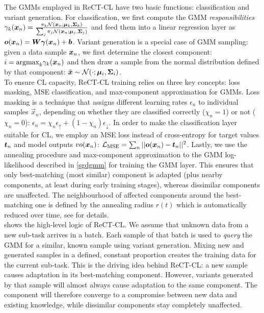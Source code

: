 \documentclass{article} %
\newcommand{\vgamma}{{\bm \gamma}}
\begin{document}
The GMMs emplayed in ReCT-CL have two basic functions: classification and variant generation.
For classification, 
we first compute the GMM \textit{responsibilities} $\gamma_k({\bm{x}}_n) = \frac{\pi_k\mathcal N({\bm{x}}_n; {\bm{\mu}}_k,{\bm{\Sigma}}_k)}{\sum_j \pi_j \mathcal N({\bm{x}}_n; {\bm{\mu}}_j,{\bm{\Sigma}}_j)}$ and feed them into a linear regression layer as $\vo(\vx_n) = \mW\vgamma(\vx_n) + \vb$.
Variant generation is a special case of GMM sampling: given a data sample ${\bm{x}}_n$, we first determine the closest component: $i = \text{argmax}_k \gamma_k({\bm{x}}_n)$ and then draw a sample from the normal distribution defined by that component: $\hat {{\bm{x}}} \sim \mathcal N(\cdot; {\bm{\mu}}_i, {\bm{\Sigma}}_i)$.
\\
To ensure CL capacity, ReCT-CL training relies on three key concepts: loss masking, MSE classification, and max-component approximation for GMMs. 
Loss masking is a technique that assigns different learning rates $\epsilon_n$ to individual samples $\vec x_n$, depending on whether they are classified correctly ($\chi_n = 1$) or not ($\chi_n = 0$): 
$\epsilon_n = \chi_n\epsilon_\uparrow + (1-\chi_n)\epsilon_{\downarrow}$.
In order to make the classification layer suitable for CL, we employ an MSE loss instead of cross-entropy for target values ${\bm{t}}_n$ and model outputs $vo({\bm{x}}_n)$: $\mathcal L_\text{MSE} = \sum_n ||{\bm{o}}({\bm{x}}_n)-{\bm{t}}_n||^2$. %
Lastly, we use the annealing procedure and max-component approximation to the GMM log-likelihood described in \cref{sgdgmm} for training the GMM layer. This ensures that only best-matching (most similar) component is adapted (plus nearby components, at least during early training stages), whereas dissimilar components are unaffected. The neighbourhood of affected components around the best-matching one is defined by the annealing radius $r(t)$ which is automatically reduced over time, see \cite{sgdgmm} for details.
\\
 shows the high-level logic of ReCT-CL. We assume that unknown data from a new sub-task arrives in a batch. 
Each sample of that batch is used to \textit{query} the GMM for a similar, known sample using variant generation. Mixing new and generated samples in a defined, constant proportion creates the training data for the current sub-task. 
This is the driving idea behind ReCT-CL: 
a new sample causes adaptation in its best-matching component. However, variants generated by that sample will almost always cause adaptation to the same component. The component will therefore converge to a compromise between new data and existing knowledge, while
dissimilar components stay completely unaffected. 
%
%
\end{document}
